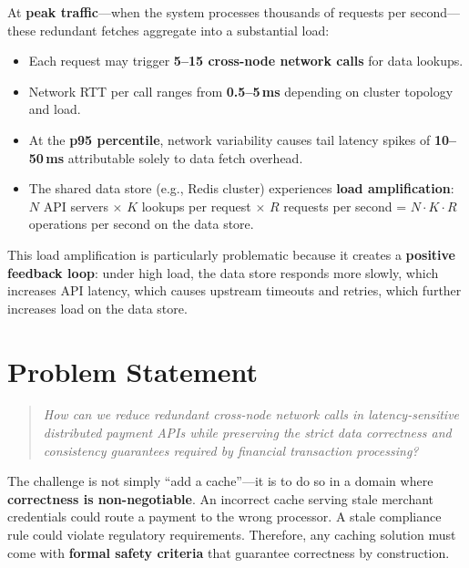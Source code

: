 \documentclass[12pt,a4paper]{report}
\begin{document}
At \textbf{peak traffic}—when the system processes thousands of requests per second—these redundant fetches aggregate into a substantial load:

\begin{itemize}
    \item Each request may trigger \textbf{5–15 cross-node network calls} for data lookups.
    \item Network RTT per call ranges from \textbf{0.5–5\,ms} depending on cluster topology and load.
    \item At the \textbf{p95 percentile}, network variability causes tail latency spikes of \textbf{10–50\,ms} attributable solely to data fetch overhead.
    \item The shared data store (e.g., Redis cluster) experiences \textbf{load amplification}: $N$ API servers $\times$ $K$ lookups per request $\times$ $R$ requests per second = $N \cdot K \cdot R$ operations per second on the data store.
\end{itemize}

This load amplification is particularly problematic because it creates a \textbf{positive feedback loop}: under high load, the data store responds more slowly, which increases API latency, which causes upstream timeouts and retries, which further increases load on the data store.

\section{Problem Statement}

\begin{quote}
\textit{How can we reduce redundant cross-node network calls in latency-sensitive distributed payment APIs while preserving the strict data correctness and consistency guarantees required by financial transaction processing?}
\end{quote}

The challenge is not simply ``add a cache''—it is to do so in a domain where \textbf{correctness is non-negotiable}. An incorrect cache serving stale merchant credentials could route a payment to the wrong processor. A stale compliance rule could violate regulatory requirements. Therefore, any caching solution must come with \textbf{formal safety criteria} that guarantee correctness by construction.

\end{document}

